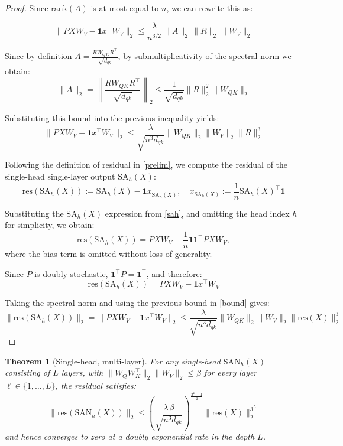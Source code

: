 \documentclass{article}
\theoremstyle{definition}
\theoremstyle{plain}
\newtheorem{theorem}{Theorem}
\begin{document}
\begin{appendices}
\begin{proof}
{Since $\mathrm{rank}(A)$ is at most equal to $n$, we can rewrite this as:}

{\[
\|PXW_V - \mathbf{1}x^\top W_V\|_2
\le
\frac{\lambda}{n^{3/2}}\,
\|A\|_2\,\|R\|_2\,\|W_V\|_2
\]}

Since by definition
$
A
=
\frac{R W_{QK} R^\top}{\sqrt{d_{qk}}}
$,
by submultiplicativity of the spectral norm we obtain:
\[
\|A\|_2
=
\left\|
\frac{R W_{QK} R^\top}{\sqrt{d_{qk}}}
\right\|_2
\le
\frac{1}{\sqrt{d_{qk}}}
\|R\|_2^2
\|W_{QK}\|_2
\]

Substituting this bound into the previous inequality yields:
\begin{equation}\label{bound}
\|PXW_V - \mathbf{1} x^\top W_V\|_2
\le
\frac{\lambda}{\sqrt{n^{3}d_{qk}}}
\|W_{QK}\|_2
\|W_V\|_2
\|R\|_2^3
\end{equation}

Following the definition of residual in \cref{prelim}, we compute the residual of the single-head single-layer output $\mathrm{SA}_h(X)$:
\begin{equation}\label{equ:residual_sa}
\mathrm{res}(\mathrm{SA}_h(X)) := \mathrm{SA}_h(X) - \mathbf{1} x_{\mathrm{SA}_h(X)}^\top,
\quad
x_{\mathrm{SA}_h(X)} := \frac{1}{n} \mathrm{SA}_h(X)^\top \mathbf{1}
\end{equation}

Substituting the $\mathrm{SA}_h(X)$ expression from \ref{sah}, and omitting the head index $h$ for simplicity, we obtain:
\begin{equation}\label{equ:residual_sa_w}
\mathrm{res}(\mathrm{SA}{_h}(X))
=
P X W_V - \frac{1}{n}\mathbf{1}\mathbf{1}^\top P X W_V,
\end{equation}
where the bias term is omitted without loss of generality.

Since $P$ is doubly stochastic, $\mathbf{1}^\top P = \mathbf{1}^\top$, and therefore:
\[
\mathrm{res}(\mathrm{SA}{_h}(X))
=
PXW_V - \mathbf{1} x^\top W_V
\]

Taking the spectral norm and using the previous bound in \ref{bound} gives: 
\[
\|\mathrm{res}(\mathrm{SA}{_h}(X))\|_2
=
\|PXW_V - \mathbf{1} x^\top W_V\|_2
\le
\frac{\lambda}{\sqrt{n^{3}d_{qk}}}
\|W_{QK}\|_2
\|W_V\|_2
\|\mathrm{res}(X)\|_2^3
\]
\end{proof}

\begin{theorem}[Single-head, multi-layer]
\label{thm:residual_multilayer}
{For any single-head $\mathrm{SAN}{_h}(X)$ consisting of $L$ layers, with $\|W_Q W_K^\top\|_2\|W_V\|_2 \le \beta$ for every layer $\ell \in \{1,\dots,L\}$, the residual satisfies}:
\[
\boxed{
\|\mathrm{res}(\mathrm{SAN}{_h}(X))\|_2
\le
\left(
\frac{\lambda\, \beta}{\sqrt{n^{3}d_{qk}}}
\right)^{\frac{3^L-1}{2}}
\|\mathrm{res}(X)\|_2^{3^L}
}
\]
and hence converges to zero at a doubly exponential rate in the depth $L$.
\end{theorem}


\end{appendices}
\end{document}
